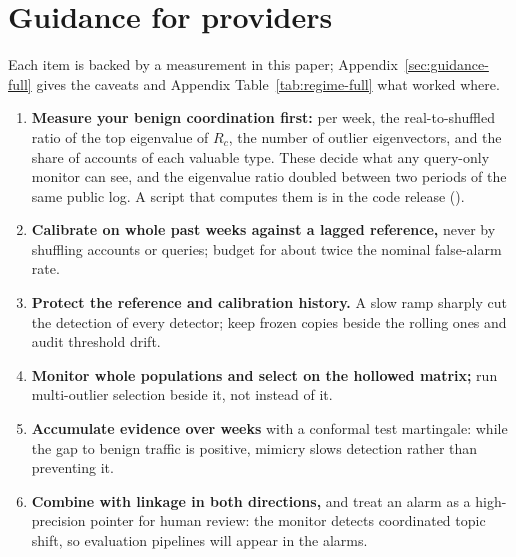 \section{Guidance for providers}
\label{sec:guidance}

Each item is backed by a measurement in this paper; Appendix~\ref{sec:guidance-full} gives the caveats and Appendix Table~\ref{tab:regime-full} what worked where.
\begin{enumerate}[leftmargin=1.5em,itemsep=1pt,topsep=2pt]
\item \textbf{Measure your benign coordination first:} per week, the real-to-shuffled ratio of the top eigenvalue of $R_c$, the number of outlier eigenvectors, and the share of accounts of each valuable type. These decide what any query-only monitor can see, and the eigenvalue ratio doubled between two periods of the same public log. A script that computes them is in the code release (\coderepo).
\item \textbf{Calibrate on whole past weeks against a lagged reference,} never by shuffling accounts or queries; budget for about twice the nominal false-alarm rate.
\item \textbf{Protect the reference and calibration history.} A slow ramp sharply cut the detection of every detector; keep frozen copies beside the rolling ones and audit threshold drift.
\item \textbf{Monitor whole populations and select on the hollowed matrix;} run multi-outlier selection beside it, not instead of it.
\item \textbf{Accumulate evidence over weeks} with a conformal test martingale: while the gap to benign traffic is positive, mimicry slows detection rather than preventing it.
\item \textbf{Combine with linkage in both directions,} and treat an alarm as a high-precision pointer for human review: the monitor detects coordinated topic shift, so evaluation pipelines will appear in the alarms.
\end{enumerate}
